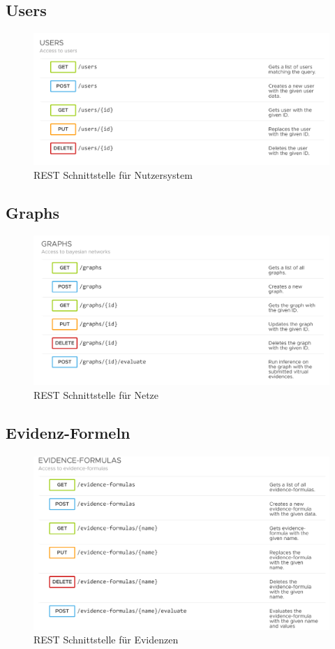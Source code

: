 \documentclass{article}
\begin{document}
\subsection{Users}
\begin{figure}[ht!]
    \includegraphics[width=\linewidth]{image/REST_Users.png}
    \caption{REST Schnittstelle für Nutzersystem}
\end{figure}
\newpage
\subsection{Graphs}
\begin{figure}[ht!]
    \includegraphics[width=\linewidth]{image/REST_Graphs.png}
    \caption{REST Schnittstelle für Netze}
\end{figure}
\subsection{Evidenz-Formeln}
\begin{figure}[ht!]
    \includegraphics[width=\linewidth]{image/REST_Evid.png}
    \caption{REST Schnittstelle für Evidenzen}
\end{figure}
\end{document}
